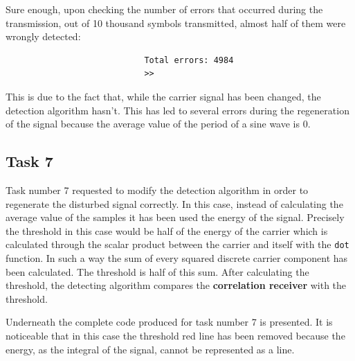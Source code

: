 \FloatBarrier\noindent Sure enough, upon checking the number of errors that occurred during the transmission, out of 10 thousand symbols transmitted, almost half of them were wrongly detected:

\begin{verbatim}
                            Total errors: 4984
                            >> 
\end{verbatim}
This is due to the fact that, while the carrier signal has been changed, the detection algorithm hasn't. This has led to several errors during the regeneration of the signal because the average value of the period of a sine wave is 0.

% 
\subsection*{Task 7}
Task number 7 requested to modify the detection algorithm in order to regenerate the disturbed signal correctly. In this case, instead of calculating the average value of the samples it has been used the energy of the signal. Precisely the threshold in this case would be half of the energy of the carrier which is calculated through the scalar product between the carrier and itself with the \texttt{dot} function. In such a way the sum of every squared discrete carrier component has been calculated. The threshold is half of this sum. After calculating the threshold, the detecting algorithm compares the \textbf{correlation receiver} with the threshold.

Underneath the complete code produced for task number 7 is presented. It is noticeable that in this case the threshold red line has been removed because the energy, as the integral of the signal, cannot be represented as a line.

